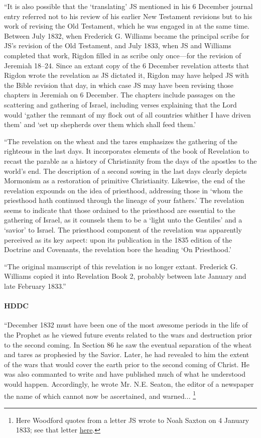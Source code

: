 			``It is also possible that the `translating' JS mentioned in his 6 December journal entry referred not to his review of his earlier New Testament revisions but to his work of revising the Old Testament, which he was engaged in at the same time. Between July 1832, when Frederick G. Williams became the principal scribe for JS's revision of the Old Testament, and July 1833, when JS and Williams completed that work, Rigdon filled in as scribe only once---for the revision of Jeremiah 18--24. Since an extant copy of the 6 December revelation attests that Rigdon wrote the revelation as JS dictated it, Rigdon may have helped JS with the Bible revision that day, in which case JS may have been revising those chapters in Jeremiah on 6 December. The chapters include passages on the scattering and gathering of Israel, including verses explaining that the Lord would `gather the remnant of my flock out of all countries whither I have driven them' and `set up shepherds over them which shall feed them.'

			``The revelation on the wheat and the tares emphasizes the gathering of the righteous in the last days. It incorporates elements of the book of Revelation to recast the parable as a history of Christianity from the days of the apostles to the world's end. The description of a second sowing in the last days clearly depicts Mormonism as a restoration of primitive Christianity. Likewise, the end of the revelation expounds on the idea of priesthood, addressing those in `whom the priesthood hath continued through the lineage of your fathers.' The revelation seems to indicate that those ordained to the priesthood are essential to the gathering of Israel, as it counsels them to be a `light unto the Gentiles' and a `savior' to Israel. The priesthood component of the revelation was apparently perceived as its key aspect: upon its publication in the 1835 edition of the Doctrine and Covenants, the revelation bore the heading `On Priesthood.'

			``The original manuscript of this revelation is no longer extant. Frederick G. Williams copied it into Revelation Book 2, probably between late January and late February 1833.''
			
		\paragraph{HDDC}
		
			``December 1832 must have been one of the most awesome periods in the life of the Prophet as he viewed future events related to the wars and destruction prior to the second coming. In Section 86 he saw the eventual separation of the wheat and tares as prophesied by the Savior. Later, he had revealed to him the extent of the wars that would cover the earth prior to the second coming of Christ. He was also commanted to write and have published much of what he understood would happen. Accordingly, he wrote Mr. N.E. Seaton, the editor of a newspaper the name of which cannot now be ascertained, and warned...%
				\footnote{%
					Here Woodford quotes from a letter JS wrote to Noah Saxton on 4 January 1833; see that letter \hyperref[EMS-1833-JS-4-JAN-1833]{here}.
					}
					
